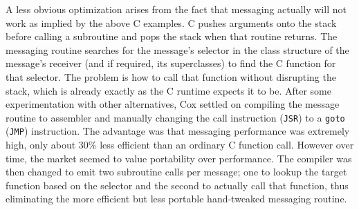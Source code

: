\documentclass[acmsmall]{acmart}\settopmatter{}
\begin{document}
A less obvious optimization arises from the fact that messaging actually will not work as implied by the above C examples. C pushes arguments onto the stack before calling a subroutine and pops the stack when that routine returns. The messaging routine searches for the message's selector in the class structure of the message's receiver (and if required, its superclasses) to find the C function for that selector. The problem is how to call that function without disrupting the stack, which is already exactly as the C runtime expects it to be. After some experimentation with other alternatives, Cox settled on compiling the message routine to assembler and manually changing the call instruction (\verb|JSR|) to a \verb|goto| (\verb|JMP|) instruction. The advantage was that messaging performance was extremely high, only about 30\% less efficient than an ordinary C function call. However over time, the market seemed to value portability over performance. The compiler was then changed to emit two subroutine calls per message; one to lookup the target function based on the selector and the second to actually call that function, thus eliminating the more efficient but less portable hand-tweaked messaging routine.
\end{document}
